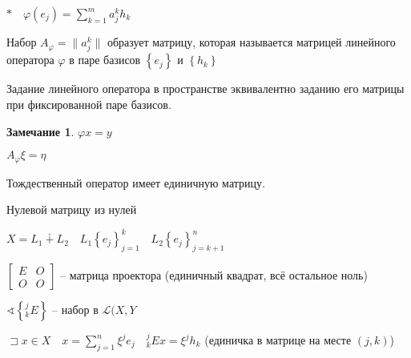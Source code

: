 \documentclass{book}
\renewcommand\O{\ensuremath{\emptyset}}
\theoremstyle{definition}
\newtheorem*{note}{Замечание}
\begin{document}
$*\quad\varphi(e_j) = \sum_{k=1}^{m} a_j^kh_k$

\begin{definition}
    Набор $A_{\varphi} = \|a_j^k\|$ образует матрицу, которая называется матрицей линейного оператора $\varphi$ в паре базисов  $\left\{ e_j \right\} $ и $\left\{ h_k \right\} $
\end{definition}

\begin{lemma}
    Задание линейного оператора в пространстве эквивалентно заданию его матрицы при фиксированной паре базисов.
\end{lemma}

\begin{note}
    $\varphi x = y$

    $A_{\varphi}\xi = \eta$

    Тождественный оператор имеет единичную матрицу.

    Нулевой матрицу из нулей

    $X = L_1 \dotplus L_2\quad L_1 \left\{ e_j \right\} _{j=1}^k\quad L_2 \left\{ e_j \right\} _{j=k+1}^n$ 

    $\begin{bmatrix} E&O\\O&O \end{bmatrix} $ -- матрица проектора (единичный квадрат, всё остальное ноль)
\end{note}

$\sphericalangle \left\{ _k^jE \right\}$  -- набор в $\mathscr{L}(X, Y$

$\sqsupset x\in X\quad x = \sum_{j=1}^{n} \xi^je_j\quad _k^jEx = \xi^jh_k$ (единичка в матрице на месте $(j,k)$)
\end{document}
